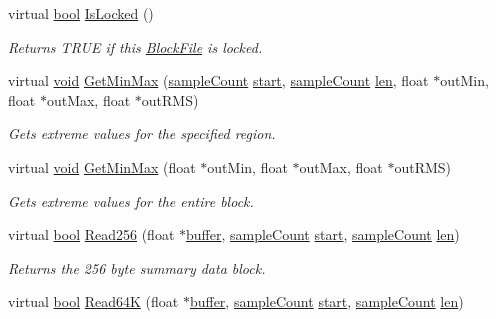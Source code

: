 \begin{DoxyCompactItemize}
virtual \hyperlink{mac_2config_2i386_2lib-src_2libsoxr_2soxr-config_8h_abb452686968e48b67397da5f97445f5b}{bool} \hyperlink{class_block_file_a6f4769dbd80bb4a14e7d28fdad672ded}{Is\+Locked} ()
\begin{DoxyCompactList}\small\item\em Returns T\+R\+UE if this \hyperlink{class_block_file}{Block\+File} is locked. \end{DoxyCompactList}\item 
virtual \hyperlink{sound_8c_ae35f5844602719cf66324f4de2a658b3}{void} \hyperlink{class_block_file_ab69b57d79727454d7cea8d1f204791ba}{Get\+Min\+Max} (\hyperlink{include_2audacity_2_types_8h_afa427e1f521ea5ec12d054e8bd4d0f71}{sample\+Count} \hyperlink{seqread_8c_ac503262ae470564980711da4f78b1181}{start}, \hyperlink{include_2audacity_2_types_8h_afa427e1f521ea5ec12d054e8bd4d0f71}{sample\+Count} \hyperlink{lib_2expat_8h_af86d325fecfc8f47b61fbf5a5146f582}{len}, float $\ast$out\+Min, float $\ast$out\+Max, float $\ast$out\+R\+MS)
\begin{DoxyCompactList}\small\item\em Gets extreme values for the specified region. \end{DoxyCompactList}\item 
virtual \hyperlink{sound_8c_ae35f5844602719cf66324f4de2a658b3}{void} \hyperlink{class_block_file_abae40b15d56cb0757abfd57ff036634a}{Get\+Min\+Max} (float $\ast$out\+Min, float $\ast$out\+Max, float $\ast$out\+R\+MS)
\begin{DoxyCompactList}\small\item\em Gets extreme values for the entire block. \end{DoxyCompactList}\item 
virtual \hyperlink{mac_2config_2i386_2lib-src_2libsoxr_2soxr-config_8h_abb452686968e48b67397da5f97445f5b}{bool} \hyperlink{class_block_file_a3f7acc98f1761d78cccbd031314a33ea}{Read256} (float $\ast$\hyperlink{structbuffer}{buffer}, \hyperlink{include_2audacity_2_types_8h_afa427e1f521ea5ec12d054e8bd4d0f71}{sample\+Count} \hyperlink{seqread_8c_ac503262ae470564980711da4f78b1181}{start}, \hyperlink{include_2audacity_2_types_8h_afa427e1f521ea5ec12d054e8bd4d0f71}{sample\+Count} \hyperlink{lib_2expat_8h_af86d325fecfc8f47b61fbf5a5146f582}{len})
\begin{DoxyCompactList}\small\item\em Returns the 256 byte summary data block. \end{DoxyCompactList}\item 
virtual \hyperlink{mac_2config_2i386_2lib-src_2libsoxr_2soxr-config_8h_abb452686968e48b67397da5f97445f5b}{bool} \hyperlink{class_block_file_acf929dfa98eab1cbd93b7d79394bc141}{Read64K} (float $\ast$\hyperlink{structbuffer}{buffer}, \hyperlink{include_2audacity_2_types_8h_afa427e1f521ea5ec12d054e8bd4d0f71}{sample\+Count} \hyperlink{seqread_8c_ac503262ae470564980711da4f78b1181}{start}, \hyperlink{include_2audacity_2_types_8h_afa427e1f521ea5ec12d054e8bd4d0f71}{sample\+Count} \hyperlink{lib_2expat_8h_af86d325fecfc8f47b61fbf5a5146f582}{len})

\end{DoxyCompactItemize}
